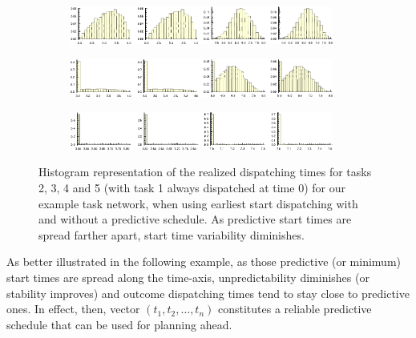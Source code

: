 	\begin{figure}
		\centering
		\begin{subfigure}[b]{0.95\textwidth}
			\centering
			\includegraphics[width=0.95\textwidth]{chapter/prelim-2/row1}
			\label{chapter:prelim-2:example-3-a}
		\end{subfigure}
		
		\begin{subfigure}[b]{0.95\textwidth}
			\centering
			\includegraphics[width=0.95\textwidth]{chapter/prelim-2/row2}
			\label{chapter:prelim-2:example-3-b}
		\end{subfigure}

		\begin{subfigure}[b]{0.95\textwidth}
			\centering
			\includegraphics[width=0.95\textwidth]{chapter/prelim-2/row4}
			\label{chapter:prelim-2:example-3-c}
		\end{subfigure}
		\caption{Histogram representation of the realized dispatching times for tasks 2, 3, 4 and 5 (with task 1 always dispatched at time 0) for our example task network,
		when using earliest start dispatching with and without a predictive schedule.
		As predictive start times are spread farther apart, start time variability diminishes.}
		\label{chapter:prelim-2:example-3}
	\end{figure}

	As better illustrated in the following example,
	as those predictive (or minimum) start times are spread along the time-axis, 
	unpredictability diminishes (or stability improves) and outcome dispatching times tend to stay close to predictive ones.
	In effect, then, vector $(t_1, t_2, \ldots, t_n)$ constitutes a reliable predictive schedule that can be used for planning ahead.

